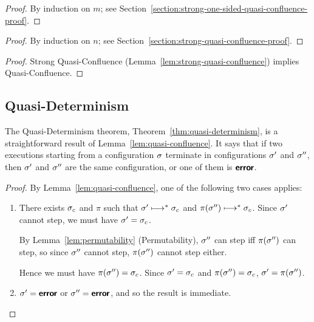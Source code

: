 \LemStrongOneSidedQuasiConfluence
\ifdefined\DISSERTATION
\begin{proof}
  By induction on $m$; see
  Section~\ref{section:strong-one-sided-quasi-confluence-proof}.
\end{proof}
\fi

\LemStrongQuasiConfluence
\ifdefined\DISSERTATION
\begin{proof}
  By induction on $n$; see
  Section~\ref{section:strong-quasi-confluence-proof}.
\end{proof}
\fi

\LemQuasiConfluence
\ifdefined\DISSERTATION
\begin{proof}
  Strong Quasi-Confluence (Lemma~\ref{lem:strong-quasi-confluence})
  implies Quasi-Confluence.
\end{proof}
\fi
 
\subsection{Quasi-Determinism}\label{subsection:quasi-quasi-determinism}

The Quasi-Determinism theorem, Theorem~\ref{thm:quasi-determinism}, is
a straightforward result of Lemma~\ref{lem:quasi-confluence}.  It says
that if two executions starting from a configuration $\sigma$ terminate
in configurations $\sigma'$ and $\sigma''$, then $\sigma'$ and $\sigma''$
are the same configuration, or one of them is $\textbf{\textsf{error}}$.

\ThmQuasiDeterminism
\ifdefined\DISSERTATION
\begin{proof}
  By Lemma~\ref{lem:quasi-confluence}, one of the following two cases
  applies:
  \begin{enumerate}
    \item There exists $\sigma_c$ and $\pi$ such that $\sigma'
      \longmapsto^* \sigma_c$ and $\pi(\sigma'') \longmapsto^* \sigma_c$.
      Since $\sigma'$ cannot step, we must have $\sigma' = \sigma_c$.

      By Lemma~\ref{lem:permutability} (Permutability), $\sigma''$ can
      step iff $\pi(\sigma'')$ can step, so since $\sigma''$ cannot
      step, $\pi(\sigma'')$ cannot step either.

      Hence we must have $\pi(\sigma'') = \sigma_c$.  Since $\sigma' =
      \sigma_c$ and $\pi(\sigma'') = \sigma_c$, $\sigma' = \pi(\sigma'')$.
    \item $\sigma' = \textbf{\textsf{error}}$ or $\sigma'' = \textbf{\textsf{error}}$, and so the result
      is immediate.
  \end{enumerate}
\end{proof}
\fi

